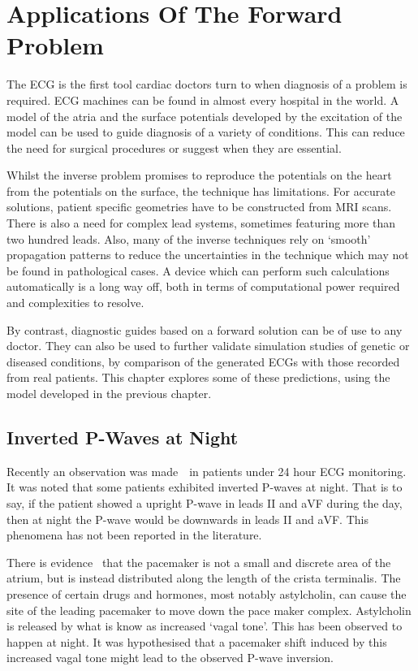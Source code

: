 \chapter{Applications Of The Forward Problem}

The ECG is the first tool cardiac doctors turn to when diagnosis of a problem is
required.
ECG machines can be found in almost every hospital in the world.
A model of the atria and the surface potentials developed by the excitation of
the model can be used to guide diagnosis of a variety of conditions.
This can reduce the need for surgical procedures or suggest when they are
essential.

Whilst the inverse problem promises to reproduce the potentials on the heart
from the potentials on the surface, the technique has limitations.
For accurate solutions, patient specific geometries have to be constructed from
MRI scans.
There is also a need for complex lead systems, sometimes featuring more than two
hundred leads.
Also, many of the inverse techniques rely on `smooth' propagation patterns to
reduce the uncertainties in the technique which may not be found in pathological
cases.
A device which can perform such calculations automatically is a long way off,
both in terms of computational power required and complexities to resolve.

By contrast, diagnostic guides based on a forward solution can be of use to any
doctor.
They can also be used to further validate simulation studies of genetic or
diseased conditions, by comparison of the generated ECGs with those recorded
from real patients.
This chapter explores some of these predictions, using the model developed in
the previous chapter.

\section{Inverted P-Waves at Night}

Recently an observation was made~\cite{BoyettPrivate}\ in patients under 24 hour
ECG monitoring.
It was noted that some patients exhibited inverted P-waves at night.
That is to say, if the patient showed a upright P-wave in leads II and aVF
during the day, then at night the P-wave would be downwards in leads II and aVF.
This phenomena has not been reported in the literature.

There is evidence~\cite{Shibata2001,Boineau1988} that the pacemaker is not a
small and discrete area of the atrium, but is instead distributed along the
length of the crista terminalis.
The presence of certain drugs and hormones, most notably astylcholin, can cause
the site of the leading pacemaker to move down the pace maker complex.
Astylcholin is released by what is know as increased `vagal tone'.
This has been observed to happen at night.
It was hypothesised that a pacemaker shift induced by this increased vagal tone
might lead to the observed P-wave inversion.

